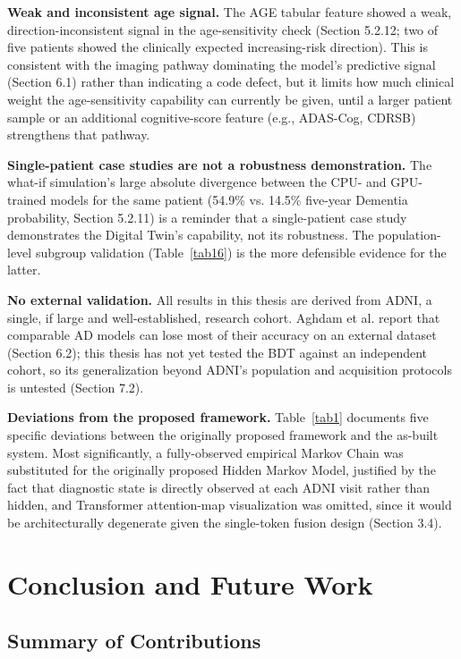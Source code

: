\documentclass[pdflatex,sn-mathphys-num]{sn-jnl}%
\theoremstyle{thmstyleone}%
\theoremstyle{thmstyletwo}%
\theoremstyle{thmstylethree}%
\begin{document}
\textbf{Weak and inconsistent age signal.} The AGE tabular feature showed a weak, direction-inconsistent signal in the age-sensitivity check (Section 5.2.12; two of five patients showed the clinically expected increasing-risk direction). This is consistent with the imaging pathway dominating the model's predictive signal (Section 6.1) rather than indicating a code defect, but it limits how much clinical weight the age-sensitivity capability can currently be given, until a larger patient sample or an additional cognitive-score feature (e.g., ADAS-Cog, CDRSB) strengthens that pathway.

\textbf{Single-patient case studies are not a robustness demonstration.} The what-if simulation's large absolute divergence between the CPU- and GPU-trained models for the same patient (54.9\% vs. 14.5\% five-year Dementia probability, Section 5.2.11) is a reminder that a single-patient case study demonstrates the Digital Twin's capability, not its robustness. The population-level subgroup validation (Table~\ref{tab16}) is the more defensible evidence for the latter.

\textbf{No external validation.} All results in this thesis are derived from ADNI, a single, if large and well-established, research cohort. Aghdam et al. \cite{bib27} report that comparable AD models can lose most of their accuracy on an external dataset (Section 6.2); this thesis has not yet tested the BDT against an independent cohort, so its generalization beyond ADNI's population and acquisition protocols is untested (Section 7.2).

\textbf{Deviations from the proposed framework.} Table~\ref{tab1} documents five specific deviations between the originally proposed framework and the as-built system. Most significantly, a fully-observed empirical Markov Chain was substituted for the originally proposed Hidden Markov Model, justified by the fact that diagnostic state is directly observed at each ADNI visit rather than hidden, and Transformer attention-map visualization was omitted, since it would be architecturally degenerate given the single-token fusion design (Section 3.4).


\FloatBarrier
\section{Conclusion and Future Work}\label{sec7}

\subsection{Summary of Contributions}\label{sec7_1}
\end{document}
